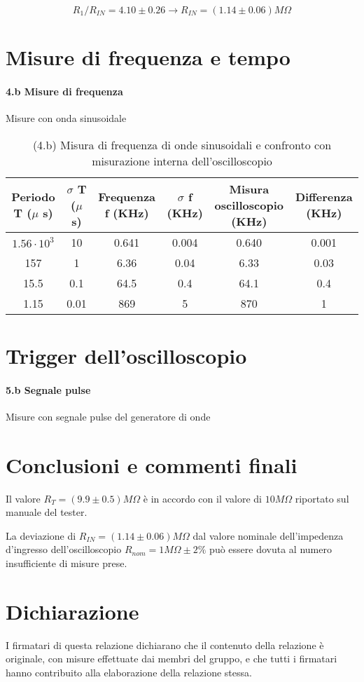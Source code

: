 \documentclass[10pt,a4paper]{article}
\begin{document}
\[ R_1/R_{IN} = 4.10  \pm  0.26  \rightarrow  R_{IN} = (1.14 \pm  0.06)  M\Omega
\]


\section{Misure di frequenza e tempo}

\paragraph{4.b Misure di frequenza}
Misure con onda sinusoidale
\begin{table}[h]
\centering
\begin{tabular}{|c|c|c|c|c|c|}
\hline 
Periodo T ($\mu$ s)& $\sigma$ T ($\mu$ s)  &Frequenza f (KHz) & $\sigma$ f (KHz) & Misura oscilloscopio (KHz) & Differenza (KHz)\\
\hline 
$1.56\cdot 10^3$& 10 & 0.641 & 0.004 & 0.640 &0.001\\
157 & 1 & 6.36 & 0.04& 6.33 &0.03\\
15.5& 0.1 & 64.5 & 0.4 & 64.1 &0.4 \\
1.15 & 0.01 & 869& 5 & 870 &1 \\
\hline 
\end{tabular} 
\caption{(4.b) Misura di frequenza di onde sinusoidali  e confronto con misurazione interna dell'oscilloscopio }
\end{table}


\section{Trigger dell'oscilloscopio}
\paragraph{5.b Segnale pulse}
Misure con segnale pulse del generatore di onde


\clearpage
\section{Conclusioni e commenti finali}
Il valore $R_T = (9.9 \pm  0.5)  M\Omega$ è in accordo con il valore di $10M\Omega$  riportato sul manuale del tester.

La deviazione di $R_{IN}  = (1.14 \pm  0.06)  M\Omega$ dal valore nominale dell'impedenza d'ingresso dell'oscilloscopio $R_{nom}= 1M\Omega \pm 2\% $ può essere dovuta al numero insufficiente di misure prese.

\section*{Dichiarazione}
I firmatari di questa relazione dichiarano che il contenuto della relazione \`e originale, con misure effettuate dai membri del gruppo, e che tutti i firmatari hanno contribuito alla elaborazione della relazione stessa.
\end{document}
